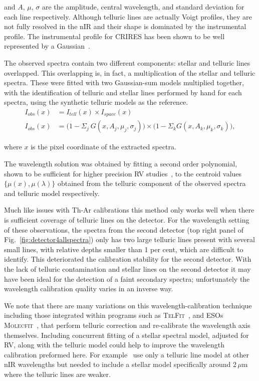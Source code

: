 \documentclass[fleqn,usenatbib]{mnras}
\begin{document}
and \(A\), \(\mu\), \(\sigma\) are the amplitude, central wavelength, and standard deviation for each line respectively. {Although telluric lines are actually Voigt profiles, they are not fully resolved in the nIR and their shape is dominated by the instrumental profile. The instrumental profile for CRIRES has been shown to be well represented by a Gaussian~\citep{seifahrt_synthesising_2010}.}

The observed spectra contain two different components: stellar and telluric lines overlapped. This overlapping is, in fact, a multiplication of the stellar and telluric spectra. These were fitted with two Gaussian-sum models multiplied together, with the identification of telluric and stellar lines performed {by hand} for each spectra, using the synthetic telluric models as the reference.
\begin{align}
I_{obs}(x) &= I_{tell}(x) \times I_{space}(x) \nonumber \\
I_{obs}(x) &= \Big(1 - {\Sigma}_{j}\ G(x, A_{j}, {\mu}_{j}, {\sigma}_{j})\Big) \times \Big(1 - {\Sigma}_{k} G(x, A_{k}, {\mu}_{k}, {\sigma}_{k})\Big), \label{eqn:obs}
\end{align}

where \(x\) is the pixel coordinate of the extracted spectra.

The wavelength solution was obtained by fitting a second order polynomial, shown to be sufficient for higher precision RV studies~\citep[e.g.][]{bean_groundbased_2010, figueira_radial_2010, seifahrt_synthesising_2010}, to the centroid values \(\{\mu(x), \mu(\lambda)\}\) obtained from the telluric component of the observed spectra and telluric model respectively.

Much like issues with Th-Ar calibrations this method only works well when there is sufficient coverage of telluric lines on the detector. For the wavelength setting of these observations, the spectra from the second detector (top right panel of Fig.~\ref{fig:detector4allspectra}) only has two large telluric lines present with several small lines, with relative depths smaller than 1 per cent, which are difficult to identify. This deteriorated the calibration stability for the second detector. With the lack of telluric contamination and stellar lines on the second detector it may have been ideal for the detection of a faint secondary spectra; unfortunately the wavelength calibration quality varies in an inverse way.

We note that there are many variations on this wavelength-calibration technique including those integrated within programs such as \textsc{TelFit}~\citet{gullikson_correcting_2014}, and ESOs \textsc{Molecfit}~\citet{smette_molecfit_2015}, that perform telluric correction and re-calibrate the wavelength axis themselves. {Including concurrent fitting of a stellar spectral model, adjusted for RV, along with the telluric model could help to improve the wavelength calibration preformed here. For example~\citet{piskorz_evidence_2016} use only a telluric line model at other nIR wavelengths but needed to include a stellar model specifically around 2\,$\mu$m where the telluric lines are weaker.}
\end{document}
